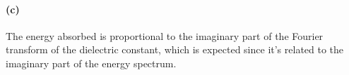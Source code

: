 \documentclass[hyperref, a4paper]{article}
\begin{document}
\paragraph{(c)} The energy absorbed is proportional to the imaginary part 
of the Fourier transform of the dielectric constant, 
which is expected since it's related to the imaginary part of the energy spectrum.

\printbibliography
\end{document}
